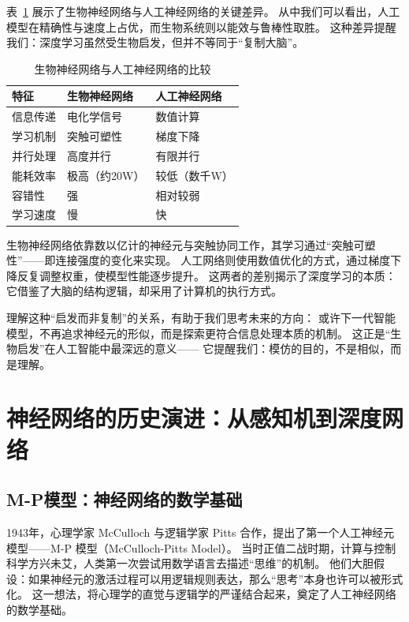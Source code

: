 表~\ref{tab:bio-vs-ann} 展示了生物神经网络与人工神经网络的关键差异。  
从中我们可以看出，人工模型在精确性与速度上占优，而生物系统则以能效与鲁棒性取胜。  
这种差异提醒我们：深度学习虽然受生物启发，但并不等同于“复制大脑”。  

\begin{table}[htbp]
\centering
\caption{生物神经网络与人工神经网络的比较}
\label{tab:bio-vs-ann}
\begin{tabular}{|l|l|l|}
\hline
{\bf 特征} & {\bf 生物神经网络} & {\bf 人工神经网络} \\
\hline
信息传递 & 电化学信号 & 数值计算 \\
\hline
学习机制 & 突触可塑性 & 梯度下降 \\
\hline
并行处理 & 高度并行 & 有限并行 \\
\hline
能耗效率 & 极高（约20W） & 较低（数千W） \\
\hline
容错性 & 强 & 相对较弱 \\
\hline
学习速度 & 慢 & 快 \\
\hline
\end{tabular}
\end{table}

生物神经网络依靠数以亿计的神经元与突触协同工作，其学习通过“突触可塑性”——即连接强度的变化来实现。  
人工网络则使用数值优化的方式，通过梯度下降反复调整权重，使模型性能逐步提升。  
这两者的差别揭示了深度学习的本质：  
它借鉴了大脑的结构逻辑，却采用了计算机的执行方式。  

理解这种“启发而非复制”的关系，有助于我们思考未来的方向：  
或许下一代智能模型，不再追求神经元的形似，而是探索更符合信息处理本质的机制。  
这正是“生物启发”在人工智能中最深远的意义——  
它提醒我们：模仿的目的，不是相似，而是理解。

\section{神经网络的历史演进：从感知机到深度网络}

\subsection{M-P模型：神经网络的数学基础}

1943年，心理学家 McCulloch 与逻辑学家 Pitts 合作，提出了第一个人工神经元模型——M-P 模型（McCulloch-Pitts Model）。  
当时正值二战时期，计算与控制科学方兴未艾，人类第一次尝试用数学语言去描述“思维”的机制。  
他们大胆假设：如果神经元的激活过程可以用逻辑规则表达，那么“思考”本身也许可以被形式化。  
这一想法，将心理学的直觉与逻辑学的严谨结合起来，奠定了人工神经网络的数学基础。

